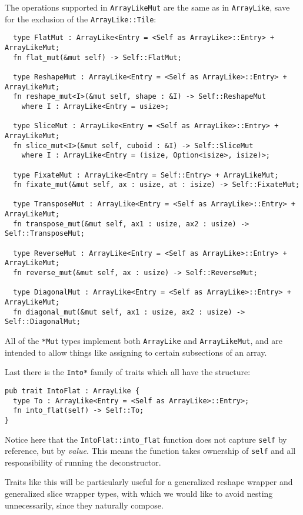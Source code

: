 \documentclass{DIKU-report-variant}
\begin{document}
The operations supported in \texttt{ArrayLikeMut} are the same as in \texttt{ArrayLike},
save for the exclusion of the \texttt{ArrayLike::Tile}:
\begin{lstlisting}
  type FlatMut : ArrayLike<Entry = <Self as ArrayLike>::Entry> + ArrayLikeMut;
  fn flat_mut(&mut self) -> Self::FlatMut;

  type ReshapeMut : ArrayLike<Entry = <Self as ArrayLike>::Entry> + ArrayLikeMut;
  fn reshape_mut<I>(&mut self, shape : &I) -> Self::ReshapeMut
    where I : ArrayLike<Entry = usize>;

  type SliceMut : ArrayLike<Entry = <Self as ArrayLike>::Entry> + ArrayLikeMut;
  fn slice_mut<I>(&mut self, cuboid : &I) -> Self::SliceMut
    where I : ArrayLike<Entry = (isize, Option<isize>, isize)>;

  type FixateMut : ArrayLike<Entry = Self::Entry> + ArrayLikeMut;
  fn fixate_mut(&mut self, ax : usize, at : isize) -> Self::FixateMut;

  type TransposeMut : ArrayLike<Entry = <Self as ArrayLike>::Entry> + ArrayLikeMut;
  fn transpose_mut(&mut self, ax1 : usize, ax2 : usize) -> Self::TransposeMut;

  type ReverseMut : ArrayLike<Entry = <Self as ArrayLike>::Entry> + ArrayLikeMut;
  fn reverse_mut(&mut self, ax : usize) -> Self::ReverseMut;
  
  type DiagonalMut : ArrayLike<Entry = <Self as ArrayLike>::Entry> + ArrayLikeMut;
  fn diagonal_mut(&mut self, ax1 : usize, ax2 : usize) -> Self::DiagonalMut;
\end{lstlisting}
All of the \texttt{*Mut} types implement both \texttt{ArrayLike} and \texttt{ArrayLikeMut},
and are intended to allow things like assigning to certain subsections of an array.

Last there is the \texttt{Into*} family of traits which all have the structure:
\begin{lstlisting}
pub trait IntoFlat : ArrayLike {
  type To : ArrayLike<Entry = <Self as ArrayLike>::Entry>;
  fn into_flat(self) -> Self::To;
}
\end{lstlisting}
Notice here that the \texttt{IntoFlat::into\_flat} function does not capture \texttt{self} by
reference, but by \textit{value}. This means the function takes ownership of \texttt{self} and
all responsibility of running the deconstructor.

Traits like this will be particularly useful for a generalized reshape wrapper and generalized slice wrapper
types, with which we would like to avoid nesting unnecessarily, since they naturally compose.
\end{document}
